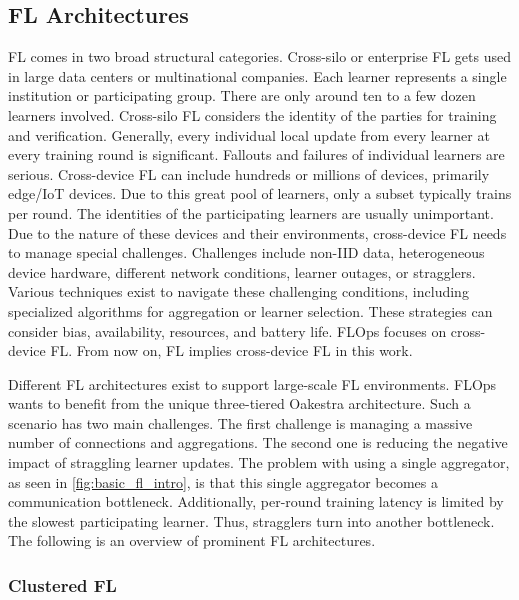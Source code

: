 \subsection{FL Architectures}

FL comes in two broad structural categories.
Cross-silo or enterprise FL gets used in large data centers or multinational companies.
Each learner represents a single institution or participating group.
There are only around ten to a few dozen learners involved.
Cross-silo FL considers the identity of the parties for training and verification.
Generally, every individual local update from every learner at every training round is significant.
Fallouts and failures of individual learners are serious.
Cross-device FL can include hundreds or millions of devices, primarily edge/IoT devices.
Due to this great pool of learners, only a subset typically trains per round.
The identities of the participating learners are usually unimportant.
Due to the nature of these devices and their environments, cross-device FL needs to manage special challenges.
Challenges include non-IID data, heterogeneous device hardware, different network conditions, learner outages, or stragglers.
Various techniques exist to navigate these challenging conditions, including specialized algorithms for aggregation or learner selection.
These strategies can consider bias, availability, resources, and battery life.
FLOps focuses on cross-device FL.
From now on, FL implies cross-device FL in this work.

Different FL architectures exist to support large-scale FL environments.
FLOps wants to benefit from the unique three-tiered Oakestra \cite{paper:oakestra_usenix} architecture.
Such a scenario has two main challenges.
The first challenge is managing a massive number of connections and aggregations.
The second one is reducing the negative impact of straggling learner updates.
The problem with using a single aggregator, as seen in \ref{fig:basic_fl_intro}, is that this single aggregator becomes a communication bottleneck.
Additionally, per-round training latency is limited by the slowest participating learner.
Thus, stragglers turn into another bottleneck.
The following is an overview of prominent FL architectures.

\subsubsection{Clustered FL}

